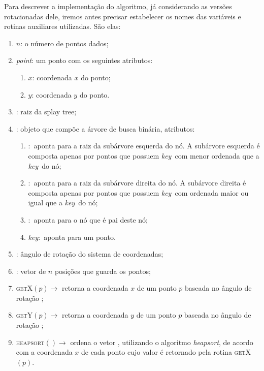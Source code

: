 Para descrever a implementação do algoritmo, já considerando as versões
rotacionadas dele, iremos antes precisar estabelecer os nomes das variáveis
e rotinas auxiliares utilizadas. São elas:
\begin{enumerate}
    \item $n$: o número de pontos dados;
    \item \textit{point}: um ponto com os seguintes atributos:
    \begin{enumerate}
        \item $x$: coordenada $x$ do ponto;
        \item $y$: coordenada $y$ do ponto.
    \end{enumerate}
    \item \raiz: raiz da splay tree;
    \item \no: objeto que compõe a árvore de busca binária,
    atributos:
    \begin{enumerate}
        \item \esq$:$ aponta para a raiz da subárvore esquerda do nó. A
        subárvore esquerda é composta apenas por pontos que possuem
        \textit{key}~com menor ordenada que a \textit{key}~do nó;
        \item \dir$:$ aponta para a raiz da subárvore direita do nó. A
        subárvore direita é composta apenas por pontos que possuem
        \textit{key}~com ordenada maior ou igual que a \textit{key}~do nó;
        \item \pai$:$ aponta para o nó que é pai deste nó;
        \item \textit{key}$:$ aponta para um ponto.
    \end{enumerate}
    \item \angulo: ângulo de rotação do sistema de coordenadas;
    \item \pontos: vetor de $n$ posições que guarda os pontos;
    \item \textsc{getX}$(p) \rightarrow$ retorna a coordenada $x$
    de um ponto $p$ baseada no ângulo de rotação \angulo;
    \item \textsc{getY}$(p) \rightarrow$ retorna a coordenada $y$
    de um ponto $p$ baseada no ângulo de rotação \angulo;
    \item \textsc{heapsort}$() \rightarrow$ ordena o vetor \pontos,
    utilizando o algoritmo \textit{heapsort}, de acordo com a
    coordenada $x$ de cada ponto cujo valor é retornado
    pela rotina \textsc{getX}$(p)$.
\end{enumerate}

